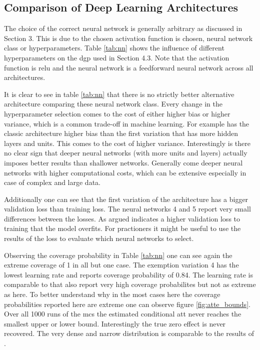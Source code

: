 \subsection{Comparison of Deep Learning Architectures}

The choice of the correct neural network is generally arbitrary as discussed in Section 3.
This is due to the chosen activation function is chosen, neural network class or hyperparameters.
Table \ref{tab:nn} shows the influence of different hyperparameters on the \ac{dgp} used in Section 4.3.
Note that the activation function is \ac{relu} and the neural network is a feedforward neural network across all architectures.

It is clear to see in table \ref{tab:nn} that there is no strictly better alternative architecture comparing these neural network class.
Every change in the  hyperparameter selection comes to the cost of either higher bias or higher variance, which is a common trade-off in machine learning.
For example has the classic architecture higher bias than the first variation that has more hidden layers and units.
This comes to the cost of higher variance.
Interestingly is there no clear sign that deeper neural networks (with more units and layers) actually imposes better results than shallower networks.
Generally come deeper neural networks with higher computational costs, which can be extensive especially in case of complex and large data.

Additionally one can see that the first variation of the architecture has a bigger validation loss than training loss.
The neural networks 4 and 5 report very small differences between the losses.
As argued indicates a higher validation loss to training that the model overfits.
For practioners it might be useful to use the results of the loss to evaluate which neural networks to select.


Observing the coverage probability in Table \ref{tab:nn} one can see again the extreme coverage of 1 in all but one case.
The exemption variation 4 has the lowest learning rate and reports coverage probability of 0.84.
The learning rate is comparable to \citet{farrellDeepNeuralNetworks2021} that also report very high coverage probabilites but not as extreme as here.
To better understand why in the most cases here the coverage probabilities reported here are extreme one can observe figure \ref{fig:atte_bounds}.
Over all 1000 runs of the \ac{mcs} the estimated conditional \ac{att} never reaches the smallest upper or lower bound.
Interestingly the true zero effect is never recovered.
The very dense and narrow distribution is comparable to the results of \citet{farrellDeepNeuralNetworks2021}.

